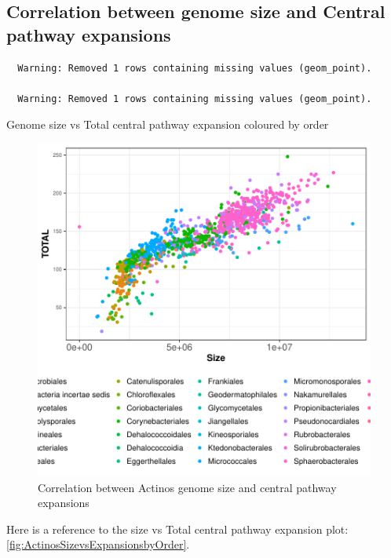 \documentclass[12pt,twoside]{reedthesis}
\begin{document}
  \subsection{Correlation between genome size and Central pathway
  expansions}\label{correlation-between-genome-size-and-central-pathway-expansions-1}
  
  \begin{verbatim}
  Warning: Removed 1 rows containing missing values (geom_point).
  
  Warning: Removed 1 rows containing missing values (geom_point).
  \end{verbatim}
  
  Genome size vs Total central pathway expansion coloured by order
  
  \begin{figure}[h!tbp]
  \centering
  \includegraphics[angle = 0,scale = 1]{chapter4/ActinosSizevsExpansionsbyOrder.pdf}
  \caption[Correlation between Actinos genome size and central pathway expansions ]{\normalsize{Correlation between Actinos genome size and central pathway expansions }}
  \label{fig:ActinosSizevsExpansionsbyOrder}
  \end{figure}
  
  Here is a reference to the size vs Total central pathway expansion plot:
  \autoref{fig:ActinosSizevsExpansionsbyOrder}. \clearpage 
  
\end{document}
